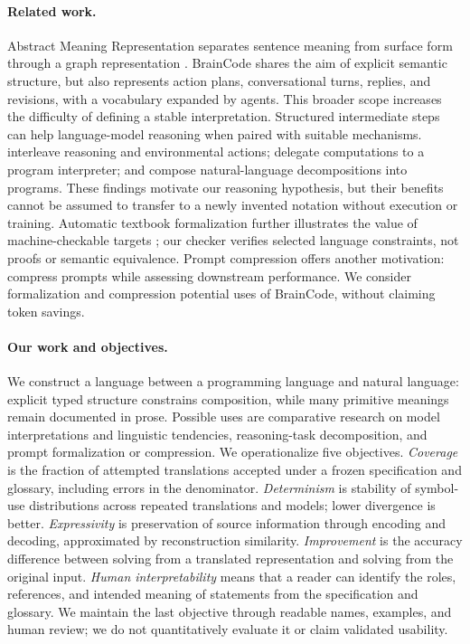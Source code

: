 \documentclass[11pt]{article}
\newcommand{\bc}{BrainCode}
\begin{document}
\paragraph{Related work.}
Abstract Meaning Representation separates sentence meaning from surface form through a graph representation \citep{banarescu2013amr}. \bc{} shares the aim of explicit semantic structure, but also represents action plans, conversational turns, replies, and revisions, with a vocabulary expanded by agents. This broader scope increases the difficulty of defining a stable interpretation.
Structured intermediate steps can help language-model reasoning when paired with suitable mechanisms. \citet{yao2023react} interleave reasoning and environmental actions; \citet{gao2023pal} delegate computations to a program interpreter; and \citet{zelikman2023parsel} compose natural-language decompositions into programs. These findings motivate our reasoning hypothesis, but their benefits cannot be assumed to transfer to a newly invented notation without execution or training. Automatic textbook formalization further illustrates the value of machine-checkable targets \citep{gloeckle2026formalization}; our checker verifies selected language constraints, not proofs or semantic equivalence. Prompt compression offers another motivation: \citet{jiang2023llmlingua} compress prompts while assessing downstream performance. We consider formalization and compression potential uses of \bc{}, without claiming token savings.

\paragraph{Our work and objectives.}
We construct a language between a programming language and natural language: explicit typed structure constrains composition, while many primitive meanings remain documented in prose. Possible uses are comparative research on model interpretations and linguistic tendencies, reasoning-task decomposition, and prompt formalization or compression. We operationalize five objectives. \emph{Coverage} is the fraction of attempted translations accepted under a frozen specification and glossary, including errors in the denominator. \emph{Determinism} is stability of symbol-use distributions across repeated translations and models; lower divergence is better. \emph{Expressivity} is preservation of source information through encoding and decoding, approximated by reconstruction similarity. \emph{Improvement} is the accuracy difference between solving from a translated representation and solving from the original input. \emph{Human interpretability} means that a reader can identify the roles, references, and intended meaning of statements from the specification and glossary. We maintain the last objective through readable names, examples, and human review; we do not quantitatively evaluate it or claim validated usability.
\end{document}
